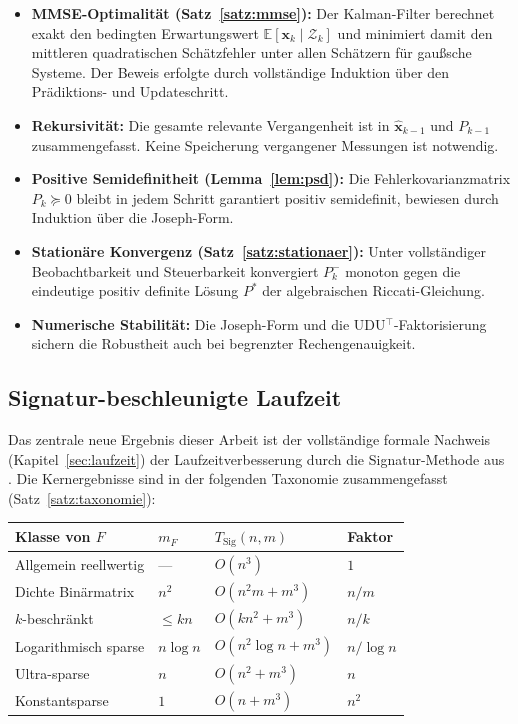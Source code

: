 ﻿\documentclass[a4paper,12pt]{article}
\theoremstyle{definition}
\begin{document}
\begin{itemize}
    \item \textbf{MMSE-Optimalität (Satz~\ref{satz:mmse}):} Der Kalman-Filter berechnet
          exakt den bedingten Erwartungswert $\mathbb{E}[\mathbf{x}_k \mid \mathcal{Z}_k]$
          und minimiert damit den mittleren quadratischen Schätzfehler unter allen
          Schätzern für gaußsche Systeme. Der Beweis erfolgte durch vollständige
          Induktion über den Prädiktions- und Updateschritt.
    \item \textbf{Rekursivität:} Die gesamte relevante Vergangenheit ist in
          $\hat{\mathbf{x}}_{k-1}$ und $P_{k-1}$ zusammengefasst. Keine Speicherung
          vergangener Messungen ist notwendig.
    \item \textbf{Positive Semidefinitheit (Lemma~\ref{lem:psd}):} Die Fehlerkovarianzmatrix
          $P_k \succeq 0$ bleibt in jedem Schritt garantiert positiv semidefinit,
          bewiesen durch Induktion über die Joseph-Form.
    \item \textbf{Stationäre Konvergenz (Satz~\ref{satz:stationaer}):} Unter vollständiger
          Beobachtbarkeit und Steuerbarkeit konvergiert $P_k^-$ monoton gegen die
          eindeutige positiv definite Lösung $P^*$ der algebraischen Riccati-Gleichung.
    \item \textbf{Numerische Stabilität:} Die Joseph-Form und die UDU$^\top$-Faktorisierung
          sichern die Robustheit auch bei begrenzter Rechengenauigkeit.
\end{itemize}

\subsection{Signatur-beschleunigte Laufzeit}

Das zentrale neue Ergebnis dieser Arbeit ist der vollständige formale Nachweis
(Kapitel~\ref{sec:laufzeit}) der Laufzeitverbesserung durch die Signatur-Methode
aus \cite{epp2026boolmm}. Die Kernergebnisse sind in der folgenden Taxonomie zusammengefasst
(Satz~\ref{satz:taxonomie}):

\begin{center}
\begin{tabular}{llll}
\toprule
\textbf{Klasse von $F$} & \textbf{$m_F$} & \textbf{$T_{\mathrm{Sig}}(n,m)$} & \textbf{Faktor} \\
\midrule
Allgemein reellwertig   & ---        & $O(n^3)$             & $1$ \\
Dichte Binärmatrix      & $n^2$      & $O(n^2 m + m^3)$     & $n/m$ \\
$k$-beschränkt          & $\leq kn$  & $O(k n^2 + m^3)$     & $n/k$ \\
Logarithmisch sparse    & $n\log n$  & $O(n^2\log n + m^3)$ & $n/\log n$ \\
Ultra-sparse            & $n$        & $O(n^2 + m^3)$       & $n$ \\
Konstantsparse          & $1$        & $O(n + m^3)$         & $n^2$ \\
\bottomrule
\end{tabular}
\end{center}
\end{document}
